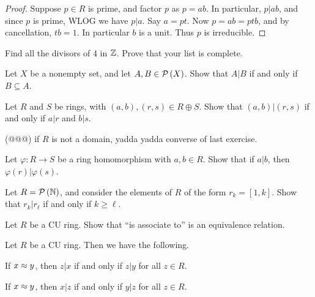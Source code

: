 \begin{proof}
Suppose \(p \in R\) is prime, and factor \(p\) as \(p = ab\). In particular, \(p|ab\), and since \(p\) is prime, WLOG we have \(p|a\). Say \(a = pt\). Now \(p = ab = ptb\), and by cancellation, \(tb = 1\). In particular \(b\) is a unit. Thus \(p\) is irreducible.
\end{proof}



\Exercises%

\begin{exercise}
Find all the divisors of 4 in \(\mathbb{Z}\). Prove that your list is complete.
\end{exercise}

\begin{exercise}
Let \(X\) be a nonempty set, and let \(A,B \in \mathcal{P}\left(X\right)\). Show that \(A|B\) if and only if \(B \subseteq A\).
\end{exercise}

\begin{exercise}
Let \(R\) and \(S\) be rings, with \((a,b), (r,s) \in R \oplus S\). Show that \((a,b) | (r,s)\) if and only if \(a|r\) and \(b|s\).
\end{exercise}

\begin{exercise}
(@@@) if \(R\) is not a domain, yadda yadda converse of last exercise.
\end{exercise}

\begin{exercise}
Let \(\varphi : R \rightarrow S\) be a ring homomorphism with \(a,b \in R\). Show that if \(a|b\), then \(\varphi(r)|\varphi(s)\).
\end{exercise}

\begin{exercise}
Let \(R = \mathcal{P}\left(\mathbb{N}\right)\), and consider the elements of \(R\) of the form \(r_k = [1,k]\). Show that \(r_k|r_\ell\) if and only if \(k \geq \ell\).
\end{exercise}

\begin{exercise} \label{exerc:assoc-equiv}
Let \(R\) be a CU ring. Show that ``is associate to'' is an equivalence relation.
\end{exercise}

\begin{exercise} \label{exerc:associate-divides}
Let \(R\) be a CU ring. Then we have the following.
\begin{proplist*}
\item If \(x \approx y\), then \(z|x\) if and only if \(z|y\) for all \(z \in R\). \label{exerc:associate-divides:divide-R}
\item If \(x \approx y\), then \(x|z\) if and only if \(y|z\) for all \(z \in R\). \label{exerc:associate-divides:divide-L}
\end{proplist*}
\end{exercise}

